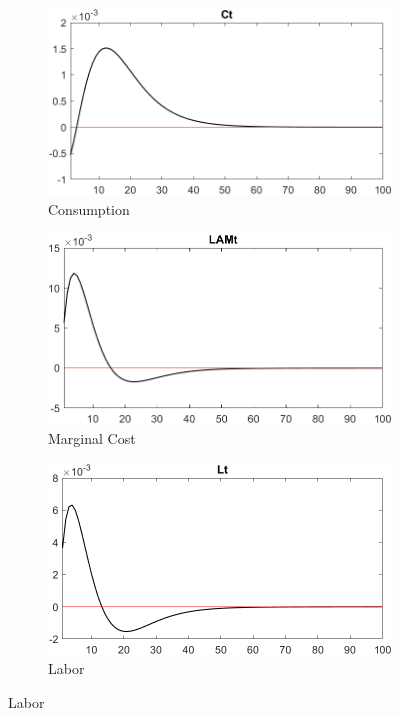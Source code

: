 \documentclass[
	12pt, 
	]{article}
\numberwithin{equation}{section}
\theoremstyle{definition}
\theoremstyle{plain}
\theoremstyle{plain}
\theoremstyle{plain}
\begin{document}
\begin{figure}[h!]
	\vspace*{0.5cm}
	
	\begin{subfigure}[b]{0.3\textwidth}
		\centering
		\includegraphics[width=\textwidth]{shock_ZMt/shock_ZMt_Ct}
		\caption{Consumption}
		\label{fig:ZMt-consumption}
	\end{subfigure}
	\hfill
	\begin{subfigure}[b]{0.3\textwidth}
		\centering
		\includegraphics[width=\textwidth]{shock_ZMt/shock_ZMt_LAMBDAt}
		\caption{Marginal Cost}
		\label{fig:ZMt-marginal-cost}
	\end{subfigure}
	\hfill
	\begin{subfigure}[b]{0.3\textwidth}
		\centering
		\includegraphics[width=\textwidth]{shock_ZMt/shock_ZMt_Lt}
		\caption{Labor}
		\label{fig:ZMt-labor}
	\end{subfigure}
	\hfill
	

\end{figure}
\end{document}

